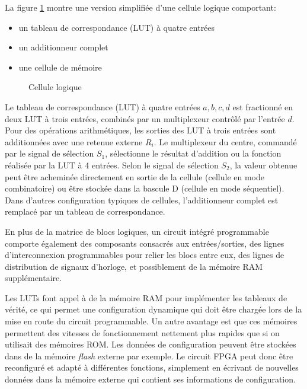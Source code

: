 \documentclass[letter, oneside]{book}
\begin{document}
La figure \ref{fig:org114ba41} montre une version simplifiée d'une cellule
logique comportant:
\begin{itemize}
\item un tableau de correspondance (LUT) à quatre entrées
\item un additionneur complet
\item une cellule de mémoire
\end{itemize}

\begin{figure}[htbp]
\centering

\caption{\label{fig:org114ba41}Cellule logique}
\end{figure}

Le tableau de correspondance (LUT) à quatre entrées \(a, b, c, d\) est
fractionné en deux LUT à trois entrées, combinés par un multiplexeur
contrôlé par l'entrée \(d\). Pour des opérations arithmétiques, les
sorties des LUT à trois entrées sont additionnées avec une retenue
externe \(R_i\). Le multiplexeur du centre, commandé par le signal de
sélection \(S_1\), sélectionne le résultat d'addition ou la fonction
réalisée par la LUT à 4 entrées. Selon le signal de sélection \(S_2\),
la valeur obtenue peut être acheminée directement en sortie de la
cellule (cellule en mode combinatoire) ou être stockée dans la bascule
D (cellule en mode séquentiel). Dans d'autres configuration typiques
de cellules, l'additionneur complet est remplacé par un tableau de
correspondance.

En plus de la matrice de blocs logiques, un circuit intégré
programmable comporte également des composants consacrés aux
entrées/sorties, des lignes d'interconnexion programmables pour relier
les blocs entre eux, des lignes de distribution de signaux d'horloge,
et possiblement de la mémoire RAM supplémentaire.

Les LUTs font appel à de la mémoire RAM pour implémenter les tableaux
de vérité, ce qui permet une configuration dynamique qui doit être
chargée lors de la mise en route du circuit programmable. Un autre
avantage est que ces mémoires permettent des vitesses de
fonctionnement nettement plus rapides que si on utilisait des mémoires
ROM.  Les données de configuration peuvent être stockées dans de la
mémoire \emph{flash} externe par exemple. Le circuit FPGA peut donc être
reconfiguré et adapté à différentes fonctions, simplement en écrivant
de nouvelles données dans la mémoire externe qui contient ses
informations de configuration.
\end{document}
